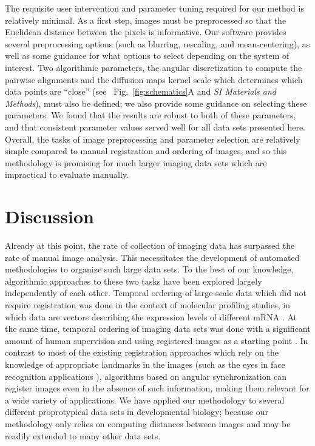 \documentclass[twocolumn, 10pt]{article}
\newcommand{\SI}[0]{\textit{SI Materials and Methods}}
\newcommand{\fig}[0]{Fig.}
\begin{document}
The requisite user intervention and parameter tuning required for our method is relatively minimal.
%
As a first step, images must be preprocessed so that the Euclidean distance between the pixels is informative.
%
Our software provides several preprocessing options (such as blurring, rescaling, and mean-centering), as well as some guidance for what options to select depending on the system of interest. 
%
Two algorithmic parameters, the angular discretization to compute the pairwise alignments and the diffusion maps kernel scale which determines which data points are ``close'' (see ~\fig~\ref{fig:schematics}A and \SI), must also be defined; we also provide some guidance on selecting these parameters.
%
We found that the results are robust to both of these parameters, and that consistent parameter values served well for all data sets presented here. 
%
Overall, the tasks of image preprocessing and parameter selection are relatively simple compared to manual registration and ordering of images, and so this methodology is promising for much larger imaging data sets which are impractical to evaluate manually. 




\section*{Discussion}

Already at this point, the rate of collection of imaging data has surpassed the rate of manual image analysis.
%
This necessitates the development of automated methodologies to organize such large data sets. 
%
To the best of our knowledge, algorithmic approaches to these two tasks have been explored largely independently of each other. 
%
Temporal ordering of large-scale data which did not require registration was done in the context of molecular profiling studies, in which data are vectors describing the expression levels of different mRNA \citep{anavy2014blind, trapnell2014dynamics, gupta2008extracting}.
%
At the same time, temporal ordering of imaging data sets was done with a significant amount of human supervision and using registered images as a starting point \citep{yuan2014automated, surkova2008characterization}.  
%
%
In contrast to most of the existing registration approaches which rely on the knowledge of appropriate landmarks in the images \citep{ian1998statistical} (such as the eyes in face recognition applications \citep{zhao2003face}), algorithms based on angular synchronization can register images even in the absence of such information, making them relevant for a wide variety of applications. 
%
We have applied our methodology to several different proprotypical data sets in developmental biology; because our methodology only relies on computing distances between images and may be readily extended to many other data sets. 
\end{document}
